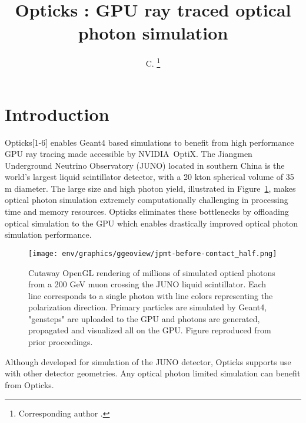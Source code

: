\documentclass{webofc}
\begin{document}
\title{Opticks : GPU ray traced optical photon simulation}
\author{ C. \fnsep\thanks{Corresponding author .}}
\abstract{}
\maketitle
%
\section{Introduction}%
\label{intro}
%
Opticks[1-6] enables Geant4\cite{g4} based simulations 
to benefit from high performance GPU ray tracing made accessible 
by NVIDIA\textregistered\ OptiX\texttrademark\cite{optix}.
%
The Jiangmen Underground Neutrino Observatory (JUNO)\cite{juno} 
located in southern China is the world's largest liquid scintillator detector, 
with a 20 kton spherical volume of 35 m diameter. The large size and high photon yield, illustrated in Figure~\ref{problem}, 
makes optical photon simulation extremely computationally challenging in processing time and memory resources. 
Opticks eliminates these bottlenecks by offloading optical simulation to the GPU which
enables drastically improved optical photon simulation performance.
%
\begin{figure}
\centering
\texttt{[image: env/graphics/ggeoview/jpmt-before-contact\_half.png]}
\caption{Cutaway OpenGL rendering of millions of simulated optical photons from a 200 GeV muon crossing the JUNO liquid scintillator. 
Each line corresponds to a single photon with line colors representing the polarization direction. 
Primary particles are simulated by Geant4, "gensteps" are uploaded to the GPU and photons are generated, propagated
and visualized all on the GPU. Figure reproduced from prior proceedings\cite{chep2019}. 
}
\label{problem}
\vspace{-5mm}
\end{figure}%
%
%
Although developed for simulation of the JUNO detector, Opticks
supports use with other detector geometries. 
Any optical photon limited simulation can benefit from Opticks.
\end{document}
